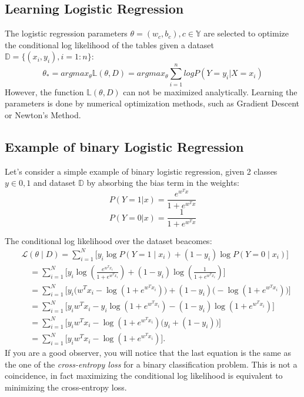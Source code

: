 \subsection{Learning Logistic Regression}
The logistic regression parameters $\theta=(w_c,b_c), c \in \mathbb{Y}$ are selected to optimize the conditional log likelihood of the tables given a dataset $\mathbb{D}=\{(x_i,y_i), i= 1:n\}$:
\begin{equation}
    \theta_*= argmax_{\theta}\mathbb{L}(\theta,D) = argmax_{\theta} \sum_{i=1}^{n} log P(Y=y_i|X=x_i)
\end{equation}
However, the function $\mathbb{L}(\theta,D)$ can not be maximized analytically. Learning the parameters is done by numerical optimization methods, such as Gradient Descent or Newton's Method.

\subsection{Example of binary Logistic Regression}
Let's consider a simple example of binary logistic regression, given 2 classes $y \in 0,1$ and dataset $\mathbb{D}$ by absorbing the bias term in the weights:
\begin{equation}
    P(Y=1|x) = \frac{e^{w^Tx}}{1 + e^{w^Tx}}
\end{equation}
\begin{equation}
    P(Y=0|x) =  \frac{1}{1 + e^{w^Tx}}
\end{equation}

The conditional log likelihood over the dataset beacomes:
\begin{equation}
    \begin{aligned}
    &\mathcal{L}(\theta\mid D)
    =\sum_{i=1}^{N} \Big[ y_i\log P(Y=1\mid x_i) + (1-y_i)\log P(Y=0\mid x_i)\Big] \\[6pt]
    &\quad= \sum_{i=1}^{N} \Bigg[ y_i\log\!\left(\frac{e^{w^{T}x_i}}{1+e^{w^{T}x_i}}\right)
    +(1-y_i)\log\!\left(\frac{1}{1+e^{w^{T}x_i}}\right) \Bigg] \\[6pt]
    &\quad= \sum_{i=1}^{N} \Bigg[ y_i\big( w^{T}x_i - \log(1+e^{w^{T}x_i})\big)
    + (1-y_i)\big( -\log(1+e^{w^{T}x_i})\big) \Bigg] \\[6pt]
    &\quad= \sum_{i=1}^{N} \Big[ y_i w^{T}x_i - y_i\log(1+e^{w^{T}x_i}) - (1-y_i)\log(1+e^{w^{T}x_i})\Big] \\[6pt]
    &\quad= \sum_{i=1}^{N} \Big[ y_i w^{T}x_i - \log(1+e^{w^{T}x_i})\big(y_i + (1-y_i)\big)\Big] \\[6pt]
    &\quad= \sum_{i=1}^{N} \Big[ y_i w^{T}x_i - \log(1+e^{w^{T}x_i})\Big].
    \end{aligned}
\end{equation}
If you are a good observer, you will notice that the last equation is the same as the one of the \emph{cross-entropy loss} for a binary classification problem. This is not a coincidence, in fact maximizing the conditional log likelihood is equivalent to minimizing the cross-entropy loss.
    
